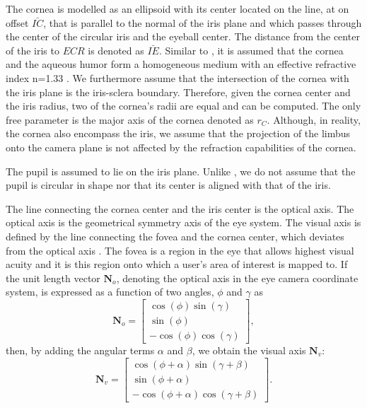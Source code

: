 \documentclass{article}
\begin{document}
The cornea is modelled as an ellipsoid with its center located on the line, at on offset $\bar{IC}$, that is parallel to the normal of the iris plane and which passes through the center of the circular iris and the eyeball center. The distance from the center of the iris to $ECR$ is denoted as $\bar{IE}$.  Similar to \cite{DierkesEtAl2018}, it is assumed that the cornea and the aqueous humor form a homogeneous medium with an effective refractive index n=1.33 \citep{GuestrinEizenman2006}.  We furthermore assume that the intersection of the cornea with the iris plane is the iris-sclera boundary.  Therefore, given the cornea center and the iris radius, two of the cornea's radii are equal and can be computed. The only free parameter is the major axis of the cornea denoted as $r_C$. Although, in reality, the cornea also encompass the iris, we assume that the projection of the limbus onto the camera plane is not affected by the refraction capabilities of the cornea.  

The pupil is assumed to lie on the iris plane.  Unlike \cite{DierkesEtAl2018}, we do not assume that the pupil is circular in shape nor that its center is aligned with that of the iris.  

The line connecting the cornea center and the iris center is the optical axis. The optical axis is the geometrical symmetry axis of the eye system.  The visual axis is defined by the line connecting the fovea and the cornea center, which deviates from the optical axis \citep{YoungSheena1975, Gross2008}.  The fovea is a region in the eye that allows highest visual acuity and it is this region onto which a user's area of interest is mapped to.  If the unit length vector $\textbf{N}_o$, denoting the optical axis in the eye camera coordinate system, is expressed as a function of two angles, $\phi$ and $\gamma$ as
\begin{equation}
    \textbf{N}_o =  \begin{bmatrix}
    \cos{(\phi)} \sin{(\gamma)}\\
    \sin{(\phi)}\\
    -\cos{(\phi)} \cos{(\gamma)}
  \end{bmatrix},
\end{equation}
then, by adding the angular terms $\alpha$ and $\beta$, we obtain the visual axis $\textbf{N}_v$:
\begin{equation}
    \textbf{N}_v =  \begin{bmatrix}
    \cos{(\phi + \alpha)} \sin{(\gamma + \beta)}\\
    \sin{(\phi + \alpha)}\\
    -\cos{(\phi + \alpha)} \cos{(\gamma + \beta)}
  \end{bmatrix} .
\end{equation}
\end{document}

